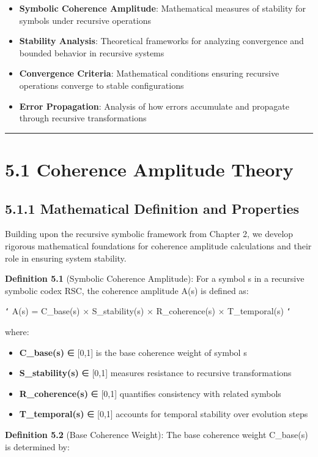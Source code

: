 \begin{itemize}
\item \textbf{Symbolic Coherence Amplitude}: Mathematical measures of stability for symbols under recursive operations
\item \textbf{Stability Analysis}: Theoretical frameworks for analyzing convergence and bounded behavior in recursive systems
\item \textbf{Convergence Criteria}: Mathematical conditions ensuring recursive operations converge to stable configurations
\item \textbf{Error Propagation}: Analysis of how errors accumulate and propagate through recursive transformations
\end{itemize}

\hrule

\section{5.1 Coherence Amplitude Theory}

\subsection{5.1.1 Mathematical Definition and Properties}

Building upon the recursive symbolic framework from Chapter 2, we develop rigorous mathematical foundations for coherence amplitude calculations and their role in ensuring system stability.

\textbf{Definition 5.1} (Symbolic Coherence Amplitude): For a symbol s in a recursive symbolic codex RSC, the coherence amplitude A(s) is defined as:

\texttt{`}
A(s) = C_base(s) × S_stability(s) × R_coherence(s) × T_temporal(s)
\texttt{`}

where:
\begin{itemize}
\item \textbf{C_base(s)} ∈ [0,1] is the base coherence weight of symbol s
\item \textbf{S_stability(s)} ∈ [0,1] measures resistance to recursive transformations
\item \textbf{R_coherence(s)} ∈ [0,1] quantifies consistency with related symbols
\item \textbf{T_temporal(s)} ∈ [0,1] accounts for temporal stability over evolution steps
\end{itemize}

\textbf{Definition 5.2} (Base Coherence Weight): The base coherence weight C_base(s) is determined by:

